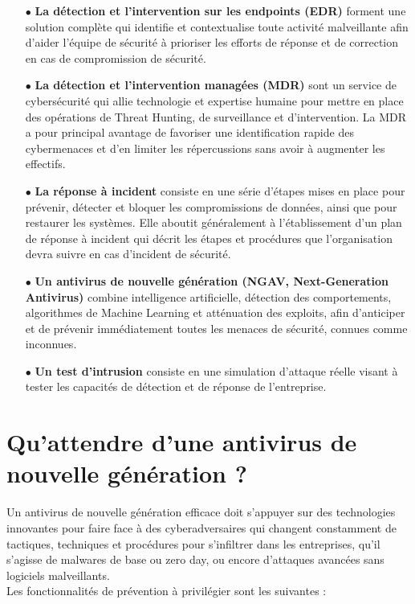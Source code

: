 \begin{itemize}
	\item[$\bullet$]\textbf{La détection et l’intervention sur les endpoints (EDR)} forment une solution complète qui identifie et contextualise toute activité malveillante afin d’aider l’équipe de sécurité à prioriser les efforts de réponse et de correction en cas de compromission de sécurité.\\
	
	\item[$\bullet$]\textbf{La détection et l’intervention managées (MDR)} sont un service de cybersécurité qui allie technologie et expertise humaine pour mettre en place des opérations de Threat Hunting, de surveillance et d’intervention. La MDR a pour principal avantage de favoriser une identification rapide des cybermenaces et d’en limiter les répercussions sans avoir à augmenter les effectifs.\\
	
	\item[$\bullet$]\textbf{La réponse à incident} consiste en une série d’étapes mises en place pour prévenir, détecter et bloquer les compromissions de données, ainsi que pour restaurer les systèmes. Elle aboutit généralement à l’établissement d’un plan de réponse à incident qui décrit les étapes et procédures que l’organisation devra suivre en cas d’incident de sécurité.\\
	
	\item[$\bullet$]\textbf{Un antivirus de nouvelle génération (NGAV, Next-Generation Antivirus)} combine intelligence artificielle, détection des comportements, algorithmes de Machine Learning et atténuation des exploits, afin d’anticiper et de prévenir immédiatement toutes les menaces de sécurité, connues comme inconnues.\\
	
	\item[$\bullet$]\textbf{Un test d’intrusion} consiste en une simulation d’attaque réelle visant à tester les capacités de détection et de réponse de l’entreprise.
	
   
\end{itemize}
\section*{Qu’attendre d’une antivirus de nouvelle génération ?}


Un antivirus de nouvelle génération efficace doit s’appuyer sur des technologies innovantes pour faire face à des cyberadversaires qui changent constamment de tactiques, techniques et procédures pour s’infiltrer dans les entreprises, qu’il s’agisse de malwares de base ou zero day, ou encore d’attaques avancées sans logiciels malveillants.\\
 Les fonctionnalités de prévention à privilégier sont les suivantes :

